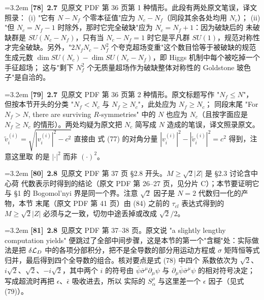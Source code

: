\par
\par\medskip\noindent\hangindent=3.2em \textbf{[78]}~\textbf{2.7}~见原文 PDF 第 36 页第 1 种情形。此段有两处原文笔误，译文照录： (i) "它有 $N-N_f$ 个零本征值"应为 $N_c-N_f$（同段其余各处均用 $N_c$）； (ii) "但 $N_c=N_f-1$ 时除外，那时它完全破缺"应为 $N_c=N_f+1$：因为破缺后的 未破缺群是 $SU(N_c-N_f)$，只有当 $N_c-N_f=1$ 时它是平凡群 $SU(1)$，规范对称性 才完全破缺。另外，"$2N_fN_c-N_f^2$ 个夸克超场变重"这个数目恰等于被破缺的规范 生成元数 $\dim SU(N_c)-\dim SU(N_c-N_f)$，即 Higgs 机制中每个被吃掉一个手征超场； 这与"剩下 $N_f^2$ 个无质量超场作为破缺整体对称性的 Goldstone 玻色子"是自洽的。
\par
\par\medskip\noindent\hangindent=3.2em \textbf{[79]}~\textbf{2.7}~见原文 PDF 第 36 页第 2 种情形。原文标题写作 "$N_f\leq N$"， 但按本节开头的分类 "$N_f<N_c$ 与 $N_f\geq N_c$"，此处应为 $N_f\geq N_c$； 同段末尾 "For $N_f>N$, there are surviving $R$-symmetries" 中的 $N$ 也应为 $N_c$（且按字面应是 $N_f\geq N_c$ 的情形）。两处均疑为原文把 $N_c$ 简写成 $N$ 造成的笔误，译文照录原文。$\tilde v_i^{(i)}=\sqrt{|v_i^{(i)}|^2-c^2}$ 直接由 式 (77) 的对角分量 $|v_i^{(i)}|^2-|\tilde v_i^{(i)}|^2=c^2$ 得到，注意这里取 的是 $|\cdot|^2$ 而非 $(\cdot)^2$。
\par
\par\medskip\noindent\hangindent=3.2em \textbf{[80]}~\textbf{2.8}~见原文 PDF 第 37 页 §2.8 开头。$M\ge\sqrt2|Z|$ 是 §2.3 讨论含中心荷 代数表示时得到的结论（原文 PDF 第 26--27 页，见分片 C）；本节要证明它与 §1 的 Bogomol'nyi 界是同一个界。注意 $\sqrt2$ 因子是 $N=2$ 代数归一化的产物，本节 末尾（原文 PDF 第 41 页）由 (84) 之前的 $\tau_{cl}$ 表达式得到的 $M\ge\sqrt2|Z|$ 必须与之一致，切勿中途丢掉或改成 $\sqrt2/2$。
\par
\par\medskip\noindent\hangindent=3.2em \textbf{[81]}~\textbf{2.8}~见原文 PDF 第 37--38 页。原文说 "a slightly lengthy computation yields" 便跳过了全部中间步骤，这是本节的第一个"含糊"处：实际做法是把 $\delta{\cal L}_D$ 中的各项分部积分，把不是全导数的部分用运动方程或 $\sigma$ 矩阵恒等式归并，最后得到四个全导数的组合。核对要点是式 (78) 中四个 系数依次为 $\sqrt2$、$i\sqrt2$、$\sqrt2$、$-i\sqrt2$，其中两个 $i$ 的符号由 $\bar\psi\bar\sigma^\mu\partial_\mu\psi$ 与 $\partial_\mu\bar\psi\bar\sigma^\mu\psi$ 的相对符号决定；写成超流时再把 $\epsilon$、$\bar\epsilon$ 吸收进去，所以 实际的 $S^\rho_\alpha$ 与这里差一个 $\epsilon$ 因子（见式 (79)）。
\par
